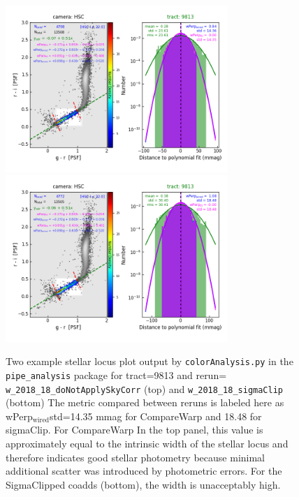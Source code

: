 \documentclass[DM,authoryear,toc]{lsstdoc}
\begin{document}
\begin{figure}
\begin{centering}
\includegraphics[width=0.75\textwidth]{figures/plot-t9813-griPSF-wFit-fit.png}
\includegraphics[width=0.75\textwidth]{figures/plot-t9813-griPSF-wFit-fit-sigmaClipped.png}
\par\end{centering}
\caption{\label{fig:wFit}  Two example stellar locus plot output by \texttt{colorAnalysis.py} in the \texttt{pipe\_analysis} package for tract=9813 and rerun= \texttt{w\_2018\_18\_doNotApplySkyCorr} (top) and  \texttt{w\_2018\_18\_sigmaClip} (bottom) The metric compared between reruns is labeled here as wPerp$_\mathrm{wired}$std=14.35 mmag for CompareWarp and 18.48 for sigmaClip.  For CompareWarp In the top panel, this value is approximately equal to the intrinsic width of the stellar locus and therefore indicates good stellar photometry because minimal additional scatter was introduced by photometric errors. For the SigmaClipped coadds (bottom), the width is unacceptably high.}
\end{figure}
\end{document}
